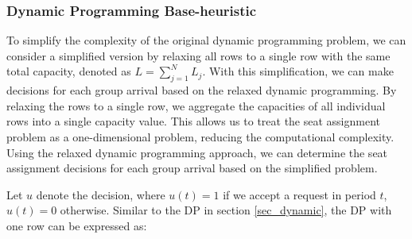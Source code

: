 
\subsubsection*{Dynamic Programming Base-heuristic}
To simplify the complexity of the original dynamic programming problem, we can consider a simplified version by relaxing all rows to a single row with the same total capacity, denoted as $L = \sum_{j=1}^{N} L_j$. With this simplification, we can make decisions for each group arrival based on the relaxed dynamic programming. By relaxing the rows to a single row, we aggregate the capacities of all individual rows into a single capacity value. This allows us to treat the seat assignment problem as a one-dimensional problem, reducing the computational complexity. Using the relaxed dynamic programming approach, we can determine the seat assignment decisions for each group arrival based on the simplified problem.



Let $u$ denote the decision, where $u(t) = 1$ if we accept a request in period $t$, $u(t) =0$ otherwise. Similar to the DP in section \ref{sec_dynamic}, the DP with one row can be expressed as:


